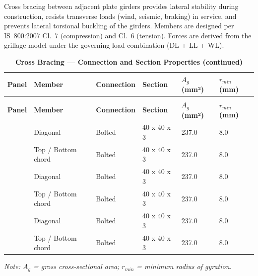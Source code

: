 \documentclass[12pt,a4paper]{report}
\numberwithin{table}{chapter}
\numberwithin{figure}{chapter}
\begin{document}
Cross bracing between adjacent plate girders provides lateral stability during construction, resists transverse loads (wind, seismic, braking) in service, and prevents lateral torsional buckling of the girders. Members are designed per IS~800:2007 Cl.~7 (compression) and Cl.~6 (tension). Forces are derived from the grillage model under the governing load combination  (DL + LL + WL).

\vspace{1em}

\vspace{0.4em}
\noindent
\setlength{\tabcolsep}{4pt}
\setlength\LTleft{0pt}
\setlength\LTright{\fill}

\begin{longtable}{|C{2.0cm}|L{2.0cm}|L{2.2cm}|C{2.5cm}|C{2.0cm}|C{2.0cm}|}
\caption{\textbf{Cross Bracing --- Connection and Section Properties}}\\
\hline
\textbf{Panel} & \textbf{Member} & \textbf{Connection} & \textbf{Section} & \textbf{$A_g$ (mm²)} & \textbf{$r_{min}$ (mm)} \\[6pt]
\hline
\endfirsthead
\caption[]{\textbf{Cross Bracing --- Connection and Section Properties (continued)}}\\
\hline
\textbf{Panel} & \textbf{Member} & \textbf{Connection} & \textbf{Section} & \textbf{$A_g$ (mm²)} & \textbf{$r_{min}$ (mm)} \\[6pt]
\hline
\endhead
\hline
\endfoot
\endlastfoot
{} & Diagonal & Bolted & 40 x 40 x 3 & 237.0 & 8.0 \\[6pt]
 & Top / Bottom chord & Bolted & 40 x 40 x 3 & 237.0 & 8.0 \\[6pt]
\hline
{} & Diagonal & Bolted & 40 x 40 x 3 & 237.0 & 8.0 \\[6pt]
 & Top / Bottom chord & Bolted & 40 x 40 x 3 & 237.0 & 8.0 \\[6pt]
\hline
{} & Diagonal & Bolted & 40 x 40 x 3 & 237.0 & 8.0 \\[6pt]
 & Top / Bottom chord & Bolted & 40 x 40 x 3 & 237.0 & 8.0 \\[6pt]
\hline
\end{longtable}
\noindent\textit{Note: $A_g$ = gross cross-sectional area; $r_{min}$ = minimum radius of gyration.}
\end{document}
